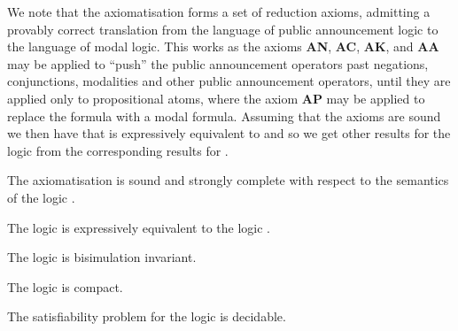 We note that the axiomatisation \axiomPalS{} forms a set of reduction axioms, admitting a provably correct translation from the language \langPal{} of public announcement logic to the language \langMl{} of modal logic.
This works as the axioms {\bf AN}, {\bf AC}, {\bf AK}, and {\bf AA} may be applied to ``push'' the public announcement operators past negations, conjunctions, modalities and other public announcement operators, until they are applied only to propositional atoms, where the axiom {\bf AP} may be applied to replace the formula with a modal formula.
Assuming that the axioms are sound we then have that \logicPalS{} is expressively equivalent to \logicS{} and so we get other results for the logic from the corresponding results for \logicS{}.

\begin{proposition}
The axiomatisation \axiomPalS{} is sound and strongly complete with respect to the semantics of the logic \logicPalS{}.
\end{proposition}

\begin{proposition}
The logic \logicPalS{} is expressively equivalent to the logic \logicS{}.
\end{proposition}

\begin{proposition}
The logic \logicPalS{} is bisimulation invariant.
\end{proposition}

\begin{proposition}
The logic \logicPalS{} is compact.
\end{proposition}

\begin{proposition}
The satisfiability problem for the logic \logicPalS{} is decidable.
\end{proposition}

